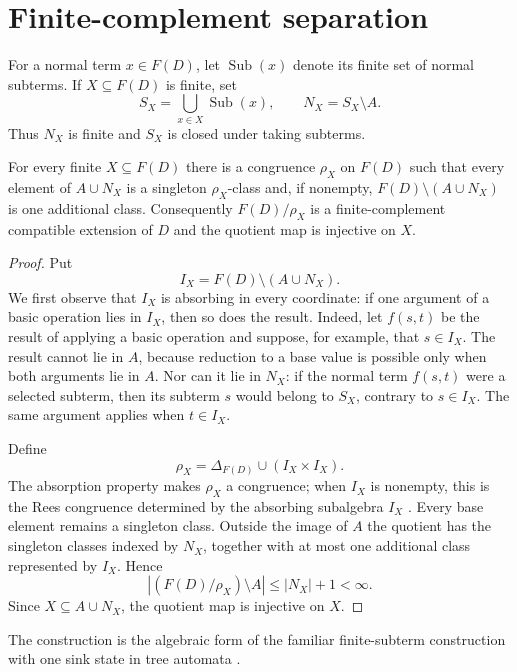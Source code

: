\section{Finite-complement separation}\label{sec:finite-separation}

For a normal term $x\in F(D)$, let $\operatorname{Sub}(x)$ denote its finite
set of normal subterms.  If $X\subseteq F(D)$ is finite, set
\[
 S_X=\bigcup_{x\in X}\operatorname{Sub}(x),
 \qquad
 N_X=S_X\setminus A.
\]
Thus $N_X$ is finite and $S_X$ is closed under taking subterms.

\begin{lemma}
\label{lem:finite-complement-rees}
For every finite $X\subseteq F(D)$ there is a congruence $\rho_X$ on $F(D)$
such that every element of $A\cup N_X$ is a singleton $\rho_X$-class and, if
nonempty, $F(D)\setminus(A\cup N_X)$ is one additional class.  Consequently
$F(D)/\rho_X$ is a finite-complement compatible extension of $D$ and the
quotient map is injective on $X$.
\end{lemma}

\begin{proof}
Put
\[
 I_X=F(D)\setminus(A\cup N_X).
\]
We first observe that $I_X$ is absorbing in every coordinate: if one argument
of a basic operation lies in $I_X$, then so does the result.  Indeed, let
$f(s,t)$ be the result of applying a basic operation and suppose, for example,
that $s\in I_X$.  The result cannot lie in $A$, because reduction to a base
value is possible only when both arguments lie in $A$.  Nor can it lie in
$N_X$: if the normal term $f(s,t)$ were a selected subterm, then its subterm
$s$ would belong to $S_X$, contrary to $s\in I_X$.  The same argument applies
when $t\in I_X$.

Define
\[
 \rho_X=\Delta_{F(D)}\cup(I_X\times I_X).
\]
The absorption property makes $\rho_X$ a congruence; when $I_X$ is nonempty,
this is the Rees congruence determined by the absorbing subalgebra $I_X$
\cite{Tichy1981}.  Every base element remains a singleton class.  Outside the
image of $A$ the quotient has the singleton classes indexed by $N_X$, together
with at most one additional class represented by $I_X$.  Hence
\[
 |(F(D)/\rho_X)\setminus A|\le |N_X|+1<\infty.
\]
Since $X\subseteq A\cup N_X$, the quotient map is injective on $X$.
\end{proof}

The construction is the algebraic form of the familiar finite-subterm
construction with one sink state in tree automata \cite{ComonEtAl2008}.

